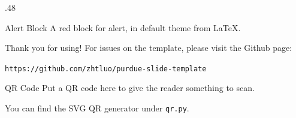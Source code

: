 \documentclass{article}
\begin{document}
\begin{frame}{}
\begin{columns}[c]
\begin{column}{.48\linewidth}
    \begin{alertblock}{Alert Block}
    A red block for alert, in default theme from \LaTeX.

    \bigskip
    
    \lipsum[7]
    \end{alertblock}

    \begin{block}{Thank you for using!}
        For issues on the template, please visit the Github page:
        
        {\small\texttt{https://github.com/zhtluo/purdue-slide-template}\par}
    \end{block}

    \begin{block}{\large QR Code}
        Put a QR code here to give the reader something to scan.

        You can find the SVG QR generator under \texttt{qr.py}.

        \begin{figure}
            {\centering}
        \end{figure}
    \end{block}
    \end{column}
    \end{columns}
    \vfill
\end{frame}
\end{document}
